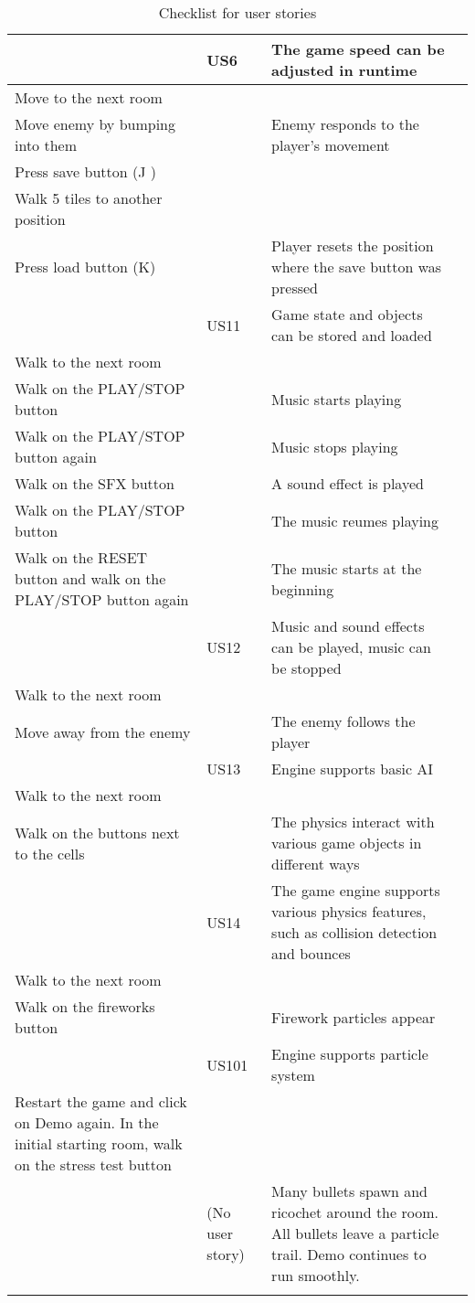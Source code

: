 \documentclass{article}
\begin{document}
\begin{longtable}{|p{3cm}|p{3cm}|p{6cm}|p{3cm}|}
& US6 & The game speed can be adjusted in runtime & \\ \hline
Move to the next room & & & \\ \hline
Move enemy by bumping into them & & Enemy responds to the player's movement & \\ \hline
Press save button  (J )& & & \\ \hline
Walk 5 tiles to another position & &  & \\ \hline
Press load button (K) & & Player resets the position where the save button was pressed & \\ \hline
& US11 & Game state and objects can be stored and loaded & \\ \hline
Walk to the next room & & & \\ \hline
Walk on the PLAY/STOP button & & Music starts playing & \\ \hline
Walk on the PLAY/STOP button again & & Music stops playing & \\ \hline
Walk on the SFX button & & A sound effect is played & \\ \hline
Walk on the PLAY/STOP button & & The music reumes playing & \\ \hline
Walk on the RESET button and walk on the PLAY/STOP button again & & The music starts at the beginning & \\ \hline
& US12 & Music and sound effects can be played, music can be stopped & \\ \hline
Walk to the next room & & & \\ \hline
Move away from the enemy & & The enemy follows the player & \\ \hline
& US13 & Engine supports basic AI & \\ \hline
Walk to the next room & & & \\ \hline
Walk on the buttons next to the cells & & The physics interact with various game objects in different ways & \\ \hline
& US14 & The game engine supports various physics features, such as collision detection and bounces & \\ \hline
Walk to the next room & & & \\ \hline
Walk on the fireworks button & & Firework particles appear & \\ \hline
& US101 & Engine supports particle system & \\ \hline
Restart the game and click on Demo again. In the initial starting room, walk on the stress test button & & & \\ \hline
& (No user story) & Many bullets spawn and ricochet around the room. All bullets leave a particle trail. Demo continues to run smoothly. & \\ \hline

\caption{Checklist for user stories}
\label{tab:user_stories}
\end{longtable}
\end{document}
